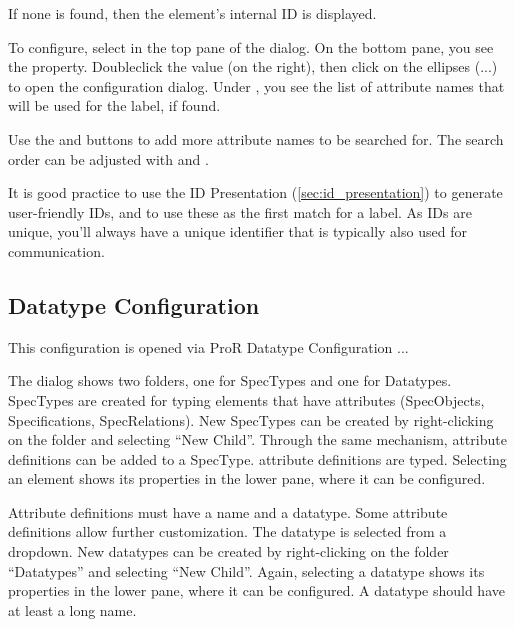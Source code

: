 {{{If none is found, then the element's internal ID is displayed.

To configure, select  in the top pane of the dialog.  On the bottom pane,
you see the  property.  Doubleclick the value (on the right), then click on the
ellipses (...) to open the configuration dialog.  Under , you see the list of attribute
names that will be used for the label, if found.

Use the  and  buttons to add more attribute names to be searched for.  The
search order can be adjusted with  and .

\begin{info}
It is good practice to use the ID Presentation (\ref{sec:id_presentation}) to generate
user-friendly IDs, and to use these as the first match for a label.  As IDs are unique, you'll always
have a unique identifier that is typically also used for communication.
\end{info}

\subsection{Datatype Configuration}
\label{sec:datatype_configuration}

This configuration is opened via ProR \textbar{} Datatype Configuration
...

The dialog shows two folders, one for SpecTypes and one for Datatypes.
SpecTypes are created for typing elements that have attributes
(SpecObjects, Specifications, SpecRelations).  New SpecTypes can be
created by right-clicking on the folder and selecting ``New Child''.
Through the same mechanism, attribute definitions can be added to a
SpecType.  attribute definitions are typed.  Selecting an element shows
its properties in the lower pane, where it can be configured.

Attribute definitions must have a name and a datatype.  Some attribute
definitions allow further customization.  The datatype is selected from a
dropdown.  New datatypes can be created by right-clicking on the folder
``Datatypes'' and selecting ``New Child''.  Again, selecting a datatype
shows its properties in the lower pane, where it can be configured.  A
datatype should have at least a long name.

}}}
